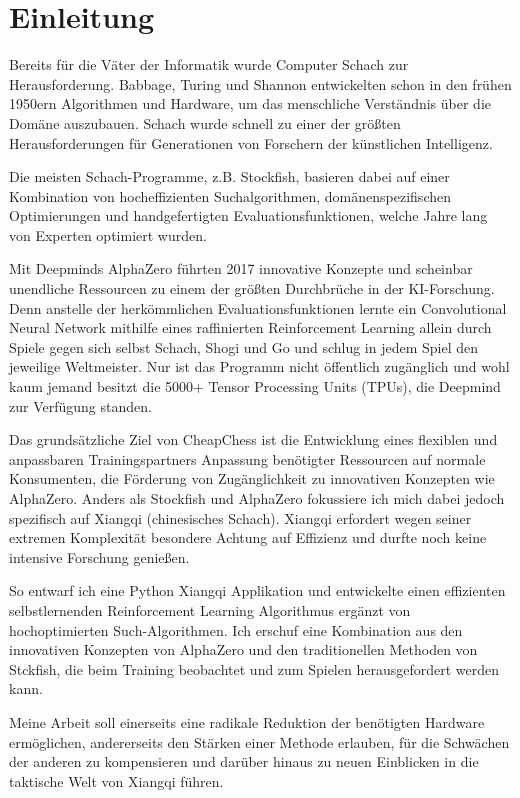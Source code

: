 \documentclass{jpp}
\begin{document}
\newpage
\section{Einleitung}\label{sec:einleitung}
Bereits für die Väter der Informatik wurde Computer Schach zur Herausforderung. Babbage, Turing und Shannon entwickelten schon in den frühen 1950ern Algorithmen und Hardware, um das menschliche Verständnis über die Domäne auszubauen. Schach wurde schnell zu einer der größten Herausforderungen für Generationen von Forschern der künstlichen Intelligenz. 

Die meisten Schach-Programme, z.B. Stockfish, basieren dabei auf einer Kombination von hocheffizienten Suchalgorithmen, domänenspezifischen Optimierungen und handgefertigten Evaluationsfunktionen, welche Jahre lang von Experten optimiert wurden. 

Mit Deepminds AlphaZero führten 2017 innovative Konzepte und scheinbar unendliche Ressourcen zu einem der größten Durchbrüche in der KI-Forschung. Denn anstelle der herkömmlichen Evaluationsfunktionen lernte ein Convolutional Neural Network mithilfe eines raffinierten Reinforcement Learning allein durch Spiele gegen sich selbst Schach, Shogi und Go und schlug in jedem Spiel den jeweilige Weltmeister. Nur ist das Programm nicht öffentlich zugänglich und wohl kaum jemand besitzt die 5000+ Tensor Processing Units (TPUs), die Deepmind zur Verfügung standen. 

Das grundsätzliche Ziel von CheapChess ist die Entwicklung eines flexiblen und anpassbaren Trainingspartners Anpassung benötigter Ressourcen auf normale Konsumenten, die Förderung von Zugänglichkeit zu innovativen Konzepten wie AlphaZero. Anders als Stockfish und AlphaZero fokussiere ich mich dabei jedoch spezifisch auf Xiangqi (chinesisches Schach). Xiangqi erfordert wegen seiner extremen Komplexität besondere Achtung auf Effizienz und durfte noch keine intensive Forschung genießen.

So entwarf ich eine Python Xiangqi Applikation und entwickelte einen effizienten selbstlernenden Reinforcement Learning Algorithmus ergänzt von hochoptimierten Such-Algorithmen. Ich erschuf eine Kombination aus den innovativen Konzepten von AlphaZero und den traditionellen Methoden von Stckfish, die beim Training beobachtet und zum Spielen herausgefordert werden kann. 

Meine Arbeit soll einerseits eine radikale Reduktion der benötigten Hardware ermöglichen, andererseits den Stärken einer Methode erlauben, für die Schwächen der anderen zu kompensieren und darüber hinaus zu neuen Einblicken in die taktische Welt von Xiangqi führen.
\end{document}
